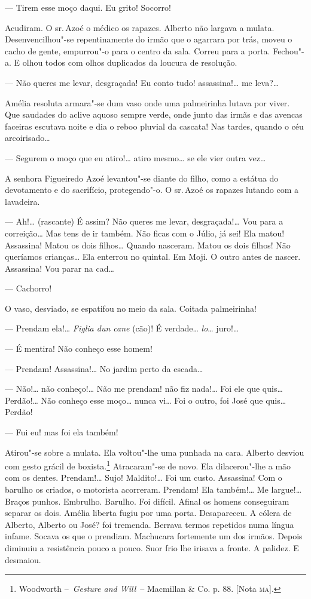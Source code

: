 --- Tirem esse moço daqui. Eu grito! Socorro!

Acudiram. O sr.\,Azoé o médico os rapazes. Alberto não largava a mulata.
Desenvencilhou"-se repentinamente do irmão que o agarrara por trás, moveu
o cacho de gente, empurrou"-o para o centro da sala. Correu para a porta.
Fechou"-a. E olhou todos com olhos duplicados da loucura de resolução.

--- Não queres me levar, desgraçada! Eu conto tudo! assassina!\ldots{} me
leva?\ldots{}

Amélia resoluta armara"-se dum vaso onde uma palmeirinha lutava por
viver. Que saudades do aclive aquoso sempre verde, onde junto das irmãs
e das avencas faceiras escutava noite e dia o reboo pluvial da cascata!
Nas tardes, quando o céu arcoirisado\ldots{}

--- Segurem o moço que eu atiro!\ldots{} atiro mesmo\ldots{} se ele vier outra
vez\ldots{}

A senhora Figueiredo Azoé levantou"-se diante do filho, como a estátua do
devotamento e do sacrifício, protegendo"-o. O sr.\,Azoé os rapazes lutando
com a lavadeira.

--- Ah!\ldots{} (rascante) É assim? Não queres me levar, desgraçada!\ldots{} Vou
para a correição\ldots{} Mas tens de ir também. Não ficas com o Júlio, já
sei! Ela matou! Assassina! Matou os dois filhos\ldots{} Quando nasceram.
Matou os dois filhos! Não queríamos crianças\ldots{} Ela enterrou no quintal.
Em Moji. O outro antes de nascer. Assassina! Vou parar na cad\ldots{}

--- Cachorro!

O vaso, desviado, se espatifou no meio da sala. Coitada palmeirinha!

--- Prendam ela!\ldots{} \emph{Figlia dun cane} (cão)! É verdade\ldots{}
\emph{lo}\ldots{} juro!\ldots{}

--- É mentira! Não conheço esse homem!

--- Prendam! Assassina!\ldots{} No jardim perto da escada\ldots{}

--- Não!\ldots{} não conheço!\ldots{} Não me prendam! não fiz nada!\ldots{} Foi ele que
quis\ldots{} Perdão!\ldots{} Não conheço esse moço\ldots{} nunca vi\ldots{} Foi o outro, foi
José que quis\ldots{} Perdão!

--- Fui eu! mas foi ela também!

Atirou"-se sobre a mulata. Ela voltou"-lhe uma punhada na cara. Alberto
desviou com gesto grácil de boxista.\footnote{Woodworth --~\emph{Gesture
  and Will}~-- Macmillan \& Co. p. 88. {[}Nota \textsc{ma}{]}.} Atracaram"-se de
novo. Ela dilacerou"-lhe a mão com os dentes. Prendam!\ldots{} Sujo!
Maldito!\ldots{} Foi um custo. Assassina! Com o barulho os criados, o
motorista acorreram. Prendam! Ela também!\ldots{} Me largue!\ldots{} Braços
punhos. Embrulho. Barulho. Foi difícil. Afinal os homens conseguiram
separar os dois. Amélia liberta fugiu por uma porta. Desapareceu. A
cólera de Alberto, Alberto ou José? foi tremenda. Berrava termos
repetidos numa língua infame. Socava os que o prendiam. Machucara
fortemente um dos irmãos. Depois diminuiu a resistência pouco a pouco.
Suor frio lhe irisava a fronte. A palidez. E desmaiou.


